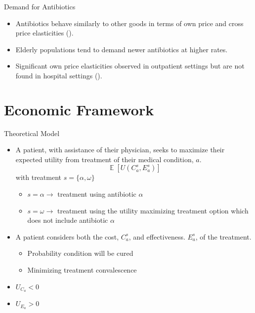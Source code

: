 \documentclass{beamer}
\DeclareMathOperator{\EX}{\mathbb{E}}
\begin{document}
\begin{frame}{Demand for Antibiotics}
\begin{itemize}
\item Antibiotics behave similarly to other goods in terms of own price and cross price elasticities (\cite{kianmehr_system_2020}).
\item Elderly populations tend to demand newer antibiotics at higher rates.
\item Significant own price elasticities observed in outpatient settings but are not found in hospital settings (\cite{kaier_impact_2013}).
\end{itemize}
\end{frame}

\section{Economic Framework}
\begin{frame}{Theoretical Model}
\begin{itemize}
\item A patient, with assistance of their physician, seeks to maximize their expected utility from treatment of their medical condition, $a$.
\begin{equation}
\EX[U(C_a^s,E_a^s)]
\end{equation}
with treatment $s = \{\alpha,\omega\}$
\begin{itemize}
  \item $s = \alpha \rightarrow$ treatment using antibiotic $\alpha$
  \item $s = \omega \rightarrow$ treatment using the utility maximizing treatment option which does not include antibiotic $\alpha$
\end{itemize}
\item A patient considers both the cost, $C_a^s$, and effectiveness. $E_a^s$, of the treatment.
  \begin{itemize}
    \item Probability condition will be cured
    \item Minimizing treatment convalescence
  \end{itemize}
\item $U_{C_a} < 0$
\item $U_{E_a} > 0$
\end{itemize}
\end{frame}
\end{document}
